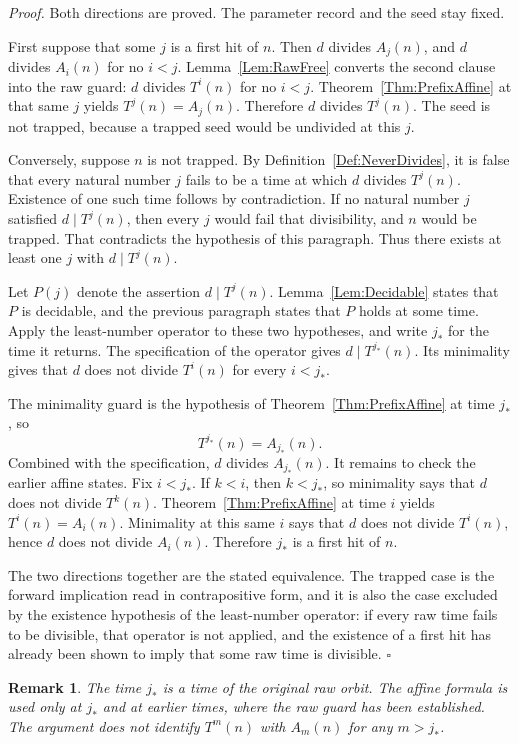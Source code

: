 \documentclass[11pt,letterpaper]{article}
\newtheorem{remark}[theorem]{Remark}
\newenvironment{proof}{\noindent\textit{Proof.}}{\hfill\(\square\)}
\begin{document}
\begin{proof}
Both directions are proved. The parameter record and the seed stay fixed.

First suppose that some \(j\) is a first hit of \(n\). Then \(d\) divides \(A_{j}(n)\), and \(d\) divides \(A_{i}(n)\) for no \(i<j\). Lemma~\ref{Lem:RawFree} converts the second clause into the raw guard: \(d\) divides \(T^{i}(n)\) for no \(i<j\). Theorem~\ref{Thm:PrefixAffine} at that same \(j\) yields \(T^{j}(n)=A_{j}(n)\). Therefore \(d\) divides \(T^{j}(n)\). The seed is not trapped, because a trapped seed would be undivided at this \(j\).

Conversely, suppose \(n\) is not trapped. By Definition~\ref{Def:NeverDivides}, it is false that every natural number \(j\) fails to be a time at which \(d\) divides \(T^{j}(n)\). Existence of one such time follows by contradiction. If no natural number \(j\) satisfied \(d\mid T^{j}(n)\), then every \(j\) would fail that divisibility, and \(n\) would be trapped. That contradicts the hypothesis of this paragraph. Thus there exists at least one \(j\) with \(d\mid T^{j}(n)\).

Let \(P(j)\) denote the assertion \(d\mid T^{j}(n)\). Lemma~\ref{Lem:Decidable} states that \(P\) is decidable, and the previous paragraph states that \(P\) holds at some time. Apply the least-number operator to these two hypotheses, and write \(j_{\ast}\) for the time it returns. The specification of the operator gives \(d\mid T^{j_{\ast}}(n)\). Its minimality gives that \(d\) does not divide \(T^{i}(n)\) for every \(i<j_{\ast}\).

The minimality guard is the hypothesis of Theorem~\ref{Thm:PrefixAffine} at time \(j_{\ast}\), so
\[
T^{j_{\ast}}(n)=A_{j_{\ast}}(n).
\]
Combined with the specification, \(d\) divides \(A_{j_{\ast}}(n)\). It remains to check the earlier affine states. Fix \(i<j_{\ast}\). If \(k<i\), then \(k<j_{\ast}\), so minimality says that \(d\) does not divide \(T^{k}(n)\). Theorem~\ref{Thm:PrefixAffine} at time \(i\) yields \(T^{i}(n)=A_{i}(n)\). Minimality at this same \(i\) says that \(d\) does not divide \(T^{i}(n)\), hence \(d\) does not divide \(A_{i}(n)\). Therefore \(j_{\ast}\) is a first hit of \(n\).

The two directions together are the stated equivalence. The trapped case is the forward implication read in contrapositive form, and it is also the case excluded by the existence hypothesis of the least-number operator: if every raw time fails to be divisible, that operator is not applied, and the existence of a first hit has already been shown to imply that some raw time is divisible.
\end{proof}

\begin{remark}
The time \(j_{\ast}\) is a time of the original raw orbit. The affine formula is used only at \(j_{\ast}\) and at earlier times, where the raw guard has been established. The argument does not identify \(T^{m}(n)\) with \(A_{m}(n)\) for any \(m>j_{\ast}\).
\end{remark}
\end{document}
